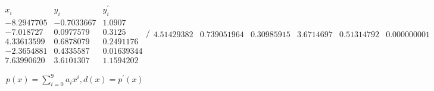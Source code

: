\documentclass{article}
\begin{document}
$%
\begin{array}{ccc}
x_{i} & y_{i} & y_{i}^{\prime } \\ 
-8.2947705 & -0.7033667 & 1.0907 \\ 
-7.018727 & 0.0977579 & 0.3125 \\ 
4.33613599 & 0.6878079 & 0.2491176 \\ 
-2.3654881 & 0.4335587 & 0.01639344 \\ 
7.63990620 & 3.6101307 & 1.1594202%
\end{array}%
/%
\begin{array}{ccc}
4.51429382 & 0.739051964 & 0.30985915%
\end{array}%
\begin{array}{ccc}
3.6714697 & 0.51314792 & 0.000000001%
\end{array}%
$

\bigskip\ $p(x)=\sum_{i=0}^{9}a_{i}x^{i},d(x)=p^{\prime }(x)$
\end{document}
